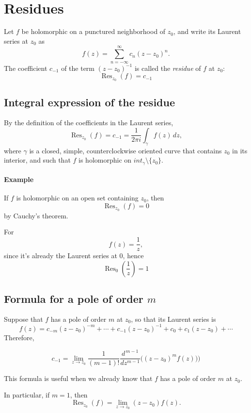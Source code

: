 \section{Residues}

\begin{definition}[Residues]
 
Let $f$ be holomorphic on a punctured neighborhood of $z_0$, and write its Laurent series at $z_0$ as
\[
f(z)=\sum_{n=-\infty}^{\infty} c_n (z-z_0)^n.
\]
The coefficient $c_{-1}$ of the term $(z-z_0)^{-1}$ is called the \emph{residue} of $f$ at $z_0$:
\[
\operatorname{Res}_{z_0}(f)=c_{-1}
\]

\end{definition}
\subsection{Integral expression of the residue}

By the definition of the coefficients in the Laurent series,
\[
  \operatorname{Res}_{z_0}(f) = c_{-1}
=
\frac{1}{2\pi i}\int_{\gamma} f(z)\,dz,
\]
where $\gamma$ is a closed, simple, counterclockwise oriented curve that contains $z_0$ in its interior, and such that $f$ is holomorphic on $int_{\gamma}\setminus \{z_0\}$.

\paragraph{Example}

If $f$ is holomorphic on an open set containing $z_0$, then
\[
\operatorname{Res}_{z_0}(f)=0
\]
by Cauchy's theorem.

For
\[
f(z)=\frac{1}{z},
\]
since it's already the Laurent series at $0$, hence
\[
\operatorname{Res}_0\!\left(\frac{1}{z}\right)=1
\]

\subsection{Formula for a pole of order \texorpdfstring{$m$}{m}}

Suppose that $f$ has a pole of order $m$ at $z_0$, so that its Laurent series is
\[
f(z)=c_{-m}(z-z_0)^{-m}+\cdots+c_{-1}(z-z_0)^{-1}+c_0+c_1(z-z_0)+\cdots
\]
Therefore,
\begin{corollary}
  
\[
c_{-1}= \lim_{z \to z_0} \frac{1}{(m-1)!}\frac{d^{\,m-1}}{dz^{m-1}}\Big((z-z_0)^m f(z))\Big)
\]

This formula is useful when we already know that $f$ has a pole of order $m$ at $z_0$.

In particular, if $m=1$, then
\[
\operatorname{Res}_{z_0}(f)
=
\lim_{z\to z_0}(z-z_0)f(z).
\]

\end{corollary}

